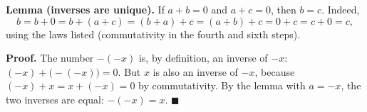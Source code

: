 \textbf{Lemma (inverses are unique).} If $a+b=0$ and $a+c=0$, then $b=c$. Indeed,
\[b=b+0=b+(a+c)=(b+a)+c=(a+b)+c=0+c=c+0=c,\]
using the laws listed (commutativity in the fourth and sixth steps).

\textbf{Proof.} The number $-(-x)$ is, by definition, an inverse of $-x$: $(-x)+\bigl(-(-x)\bigr)=0$. But $x$ is also an inverse of $-x$, because $(-x)+x=x+(-x)=0$ by commutativity. By the lemma with $a=-x$, the two inverses are equal: $-(-x)=x$. $\blacksquare$
